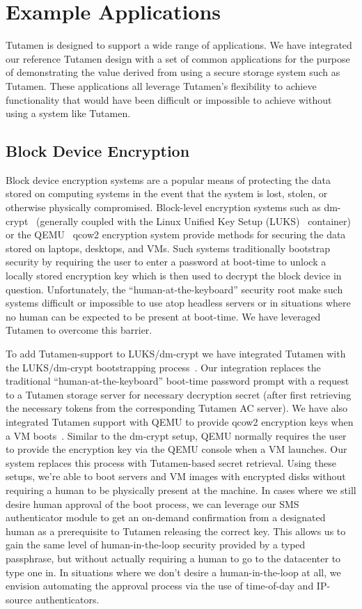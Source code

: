 \section{Example Applications}
\label{sec:apps}

Tutamen is designed to support a wide range of applications. We have
integrated our reference Tutamen design with a set of common
applications for the purpose of demonstrating the value derived from
using a secure storage system such as Tutamen. These applications all
leverage Tutamen's flexibility to achieve functionality that would
have been difficult or impossible to achieve without using a system
like Tutamen.

\subsection{Block Device Encryption}

Block device encryption systems are a popular means of protecting the
data stored on computing systems in the event that the system is lost,
stolen, or otherwise physically compromised.  Block-level encryption
systems such as dm-crypt~\cite{dm-crypt} (generally coupled with the
Linux Unified Key Setup (LUKS)~\cite{luks} container) or the
QEMU~\cite{qemu} qcow2 encryption system provide methods for securing
the data stored on laptops, desktops, and VMs. Such systems
traditionally bootstrap security by requiring the user to enter a
password at boot-time to unlock a locally stored encryption key which
is then used to decrypt the block device in question. Unfortunately,
the ``human-at-the-keyboard'' security root make such systems
difficult or impossible to use atop headless servers or in situations
where no human can be expected to be present at boot-time. We have
leveraged Tutamen to overcome this barrier.

To add Tutamen-support to LUKS/dm-crypt we have integrated Tutamen
with the LUKS/dm-crypt bootstrapping
process~\cite{src-tutamen-askpassword}. Our integration replaces the
traditional ``human-at-the-keyboard'' boot-time password prompt with a
request to a Tutamen storage server for necessary decryption secret
(after first retrieving the necessary tokens from the corresponding
Tutamen AC server). We have also integrated Tutamen support with QEMU
to provide qcow2 encryption keys when a VM
boots~\cite{src-qemu-tutamen}. Similar to the dm-crypt setup, QEMU
normally requires the user to provide the encryption key via the QEMU
console when a VM launches. Our system replaces this process with
Tutamen-based secret retrieval. Using these setups, we're able to boot
servers and VM images with encrypted disks without requiring a human
to be physically present at the machine. In cases where we still
desire human approval of the boot process, we can leverage our SMS
authenticator module to get an on-demand confirmation from a
designated human as a prerequisite to Tutamen releasing the correct
key. This allows us to gain the same level of human-in-the-loop
security provided by a typed passphrase, but without actually
requiring a human to go to the datacenter to type one in. In
situations where we don't desire a human-in-the-loop at all, we
envision automating the approval process via the use of time-of-day
and IP-source authenticators.

